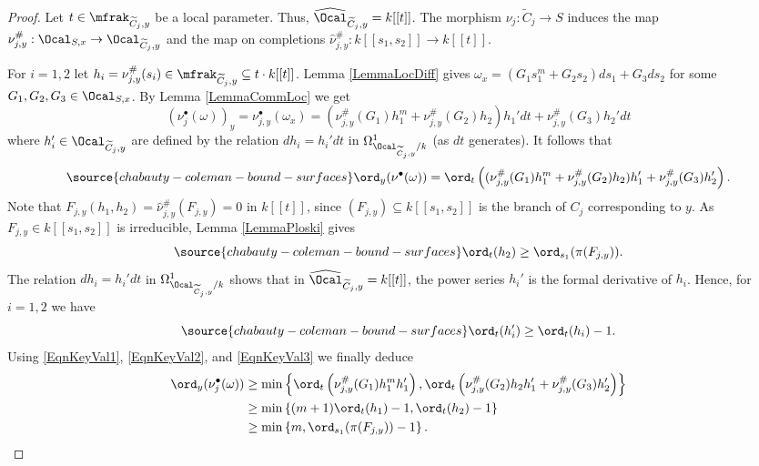 \begin{proof} Let $t\in \mfrak_{\widetilde{C}_j, y}$ be a local parameter. Thus, $\widehat{\Ocal}_{\widetilde{C}_j,y}=k[[t]]$. The morphism $\nu_{j}:\widetilde{C}_j\to S$ induces the map $\nu_{j,y}^\#: \Ocal_{S,x}\to \Ocal_{\widetilde{C}_j,y}$ and the map on completions $\widehat{\nu}_{j,y}^\#:k[[s_1,s_2]]\to k[[t]]$.

For $i=1,2$ let $h_i=\nu_{j,y}^\#(s_i)\in \mfrak_{\widetilde{C}_j,y}\subseteq t\cdot k[[t]]$. Lemma \ref{LemmaLocDiff} gives $\omega_x=(G_1s_1^m + G_2s_2)ds_1 + G_3ds_2$ for some $G_1,G_2,G_3\in \Ocal_{S,x}$. By Lemma \ref{LemmaCommLoc} we get
$$
(\nu_j^\bullet(\omega))_y = \nu_{j,y}^\bullet(\omega_x) = \left(\nu_{j,y}^\#(G_1)h_1^m +\nu_{j,y}^\#(G_2)h_2\right)h_1'dt + \nu_{j,y}^\#(G_3)h_2'dt
$$
where $h_i'\in \Ocal_{\widetilde{C}_j,y}$ are defined by the relation $dh_i=h_i'dt$ in $\Omega^1_{\Ocal_{\widetilde{C}_j,y}/k}$ (as $dt$ generates). It follows that
\begin{equation}\label{EqnKeyVal1}
\source{chabauty-coleman-bound-surfaces}
\ord_y(\nu^\bullet(\omega)) = \ord_t\left((\nu_{j,y}^\#(G_1)h_1^m +\nu_{j,y}^\#(G_2)h_2)h_1' + \nu_{j,y}^\#(G_3)h_2'\right).
\end{equation}
Note that $F_{j,y}(h_1,h_2)=\widehat{\nu}_{j,y}^\#(F_{j,y})=0$ in $k[[t]]$, since $(F_{j,y})\subseteq k[[s_1,s_2]]$ is the branch of $C_j$ corresponding to $y$. As $F_{j,y}\in k[[s_1,s_2]]$ is irreducible, Lemma \ref{LemmaPloski} gives
\begin{equation}\label{EqnKeyVal2}
\source{chabauty-coleman-bound-surfaces}
\ord_t (h_2) \ge \ord_{s_1} (\pi(F_{j,y})).
\end{equation}
The relation $dh_i=h_i'dt$ in $\Omega^1_{\Ocal_{\widetilde{C}_j,y}/k}$  shows that in $\widehat{\Ocal}_{\widetilde{C}_j,y}=k[[t]]$, the power series $h_i'$ is the formal derivative of $h_i$. Hence, for $i=1,2$ we have
\begin{equation}\label{EqnKeyVal3}
\source{chabauty-coleman-bound-surfaces}
\ord_t (h_i') \ge \ord_t (h_i)-1.
\end{equation}
Using \eqref{EqnKeyVal1}, \eqref{EqnKeyVal2}, and \eqref{EqnKeyVal3} we finally deduce
$$
\begin{aligned}
\ord_y(\nu_j^\bullet(\omega))&\ge \min\left\{ \ord_t\left(\nu_{j,y}^\#(G_1)h_1^mh_1' \right), \ord_t\left(  \nu_{j,y}^\#(G_2)h_2h_1' + \nu_{j,y}^\#(G_3)h_2'  \right)   \right\} \\
& \ge \min\left\{ (m+1) \ord_t(h_1) -1, \ord_t(h_2)-1   \right\} \\
& \ge \min\left\{  m , \ord_{s_1}(\pi(F_{j,y}))-1  \right\}.
\end{aligned}
$$
\end{proof}



